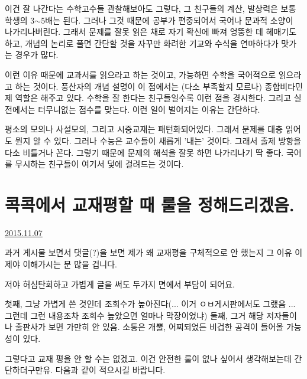 이건 잘 나간다는 수학고수들 관찰해보아도 그렇다, 그 친구들의 계산, 발상력은 보통 학생의 3$\sim$5배는 된다.
그러나 그것 때문에 공부가 편중되어서 국어나 문과적 소양이 나가리나버린다.
그래서 문제를 잘못 읽은 채로 자기 확신에 빠져 엉뚱한 데 헤매기도 하고,
개념의 논리로 풀면 간단할 것을 자꾸만 화려한 기교와 수식을 연마하다가 맛가는 경우가 많다.
\vspace{5mm}

이런 이유 때문에 교과서를 읽으라고 하는 것이고, 가능하면 수학을 국어적으로 읽으라고 하는 것이다.
풍산자의 개념 설명이 이 점에서는 (다소 부족할지 모르나) 종합비타민제 역할은 해주고 있다.
수학을 잘 한다는 친구들일수록 이런 점을 경시한다. 그리고 실전에서는 터무니없는 점수를 맞는다.
이런 일이 벌어지는 이유는 간단하다.
\vspace{5mm}

평소의 모의나 사설모의, 그리고 시중교재는 패턴화되어있다. 그래서 문제를 대충 읽어도 뭔지 알 수 있다.
그러나 수능은 교수들이 새롭게 '내는' 것이다. 그래서 출제 방향을 다소 비틀거나 꼰다.
그렇기 때문에 문제의 해석을 잘못 하면 나가리나기 딱 좋다. 국어를 무시하는 친구들이 여기서 덫에 걸려드는 것이다.
\vspace{5mm}










\section{콕콕에서 교재평할 때 룰을 정해드리겠음.}
\href{https://www.kockoc.com/Apoc/467585}{2015.11.07}

\vspace{5mm}

과거 게시물 보면서 댓글(?)을 보면 제가 왜 교재평을 구체적으로 안 했는지 그 이유 이제야 이해가시는 분 많을 겁니다.
\vspace{5mm}

저야 허심탄회하고 가볍게 글을 써도 두가지 면에서 부담이 되어요.
\vspace{5mm}

첫째, 그냥 가볍게 쓴 것인데 조회수가 높아진다(... 이거 ㅇㅂ게시판에서도 그랬음 ... 그런데 그런 내용조차 조회수 높았으면 얼마나 막장이었냐)
둘째, 그거 해당 저자들이나 출판사가 보면 가만히 안 있음. 소통은 개뿔, 어찌되었든 비겁한 공격이 들어올 가능성이 있다.
\vspace{5mm}

그렇다고 교재 평을 안 할 수는 없겠고.
이건 안전한 룰이 없나 싶어서 생각해보는데 간단하더구만유.
다음과 같이 적으시길 바랍니다.
\vspace{5mm}

